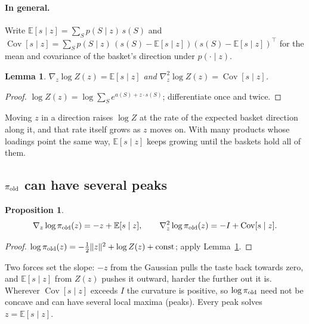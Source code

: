\documentclass[11pt,a4paper]{article}
\newtheorem{proposition}{Proposition}
\newtheorem{lemma}{Lemma}
\newcommand{\E}{\mathbb E}
\newcommand{\Cov}{\operatorname{Cov}}
\begin{document}
\paragraph{In general.} Write $\E[s\mid z]=\sum_Sp(S\mid z)\,s(S)$ and
$\Cov[s\mid z]=\sum_Sp(S\mid z)\,(s(S)-\E[s\mid z])(s(S)-\E[s\mid z])^\top$ for the mean and covariance of the basket's
direction under $p(\cdot\mid z)$.

\begin{lemma}\label{lem:grad}
$\nabla_z\log Z(z)=\E[s\mid z]$ and $\nabla_z^2\log Z(z)=\Cov[s\mid z]$.
\end{lemma}
\begin{proof}
$\log Z(z)=\log\sum_Se^{a(S)+z\cdot s(S)}$; differentiate once and twice.
\end{proof}
Moving $z$ in a direction raises $\log Z$ at the rate of the expected basket direction along it, and that rate
itself grows as $z$ moves on. With many products whose loadings point the same way, $\E[s\mid z]$ keeps growing
until the baskets hold all of them.

\subsection{$\pi_{\rm old}$ can have several peaks}

\begin{proposition}\label{prop:old}
\[
\nabla_z\log\pi_{\rm old}(z)=-z+\E[s\mid z],\qquad \nabla_z^2\log\pi_{\rm old}(z)=-I+\Cov[s\mid z].
\]
\end{proposition}
\begin{proof}
$\log\pi_{\rm old}(z)=-\tfrac12\lVert z\rVert^2+\log Z(z)+\text{const}$; apply Lemma~\ref{lem:grad}.
\end{proof}
Two forces set the slope: $-z$ from the Gaussian pulls the taste back towards zero, and $\E[s\mid z]$ from $Z(z)$
pushes it outward, harder the further out it is. Wherever $\Cov[s\mid z]$ exceeds $I$ the curvature is positive,
so $\log\pi_{\rm old}$ need not be concave and can have several local maxima (peaks). Every peak solves
$z=\E[s\mid z]$.
\end{document}
